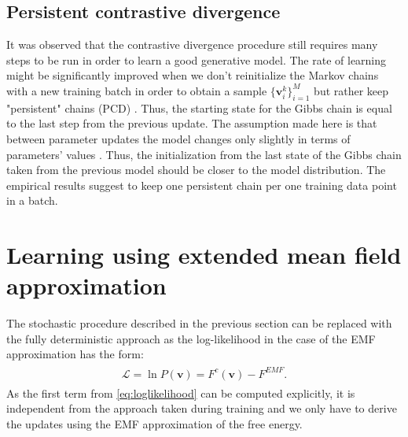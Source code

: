 \subsection{Persistent contrastive divergence}  
It was observed that the contrastive divergence procedure still requires many steps to be run in order to learn a good generative model. The rate of learning might be significantly improved when we don't reinitialize the Markov chains with a new training batch in order to obtain a sample $\{\mathbf{v}_i^k\}_{i=1}^M$ but rather keep "persistent" chains (PCD) \cite{tieleman2008training}. Thus, the starting state for the Gibbs chain is equal to the last step from the previous update. The assumption made here is that between parameter updates the model changes only slightly in terms of parameters' values \cite{neal1992connectionist}. Thus, the initialization from the last state of the Gibbs chain taken from the previous model should be closer to the model distribution. The empirical results suggest to keep one persistent chain per one training data point in a batch.

\section{Learning using extended mean field approximation}
The stochastic procedure described in the previous section can be replaced with the fully deterministic approach as the log-likelihood in the case of the EMF approximation has the form:
\begin{align}
\begin{split}
\mathcal{L} = \ln P(\mathbf{v}) = F^c(\mathbf{v}) - F^{EMF}.
\end{split}
\label{eq:emfLL}
\end{align}
As the first term from \ref{eq:loglikelihood} can be computed explicitly, it is independent from the approach taken during training and we only have to derive the updates using the EMF approximation of the free energy.


